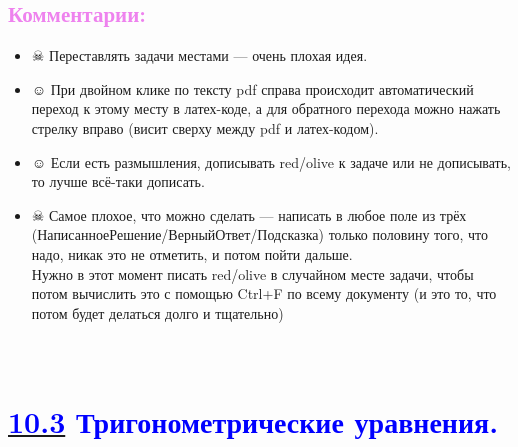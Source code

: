 \documentclass[12pt]{article}
\newcounter{num}
\newenvironment{mylist} %
{ \begin{itemize}
    \setlength{\itemsep}{0pt}
    \setlength{\parskip}{0pt}
    \setlength{\parsep}{0pt}     }
{ \end{itemize}                  }
\begin{document}
\subsection*{\textcolor{Violet}{\textbf{Комментарии:}}}%
\begin{mylist}
\item [$\skull$] Переставлять задачи местами --- очень плохая идея.

\item [$\smiley$] При двойном клике по тексту pdf справа происходит автоматический переход к этому месту в латех-коде, а для обратного перехода можно нажать стрелку вправо (висит сверху между pdf и латех-кодом).

\item [$\smiley$] Если есть размышления, дописывать red/olive к задаче или не дописывать, то лучше всё-таки дописать.

\item [$\skull$] Самое плохое, что можно сделать --- написать в любое поле из трёх (НаписанноеРешение/ВерныйОтвет/Подсказка) только половину того, что надо, никак это не отметить, и потом пойти дальше.\\ Нужно в этот момент писать red/olive в случайном месте задачи, чтобы потом вычислить это с помощью Ctrl+F по всему документу (и это то, что потом будет делаться долго и тщательно)
\end{mylist}

\newpage
\setcounter{num}{1470}

\hypertarget{10.3}{{\centering\section*{\bigskip\\\textcolor{Blue}{\hyperlink{start2}{\textcolor{Blue}{10.3}} Тригонометрические уравнения.}\vspace{-5mm}}}}
\end{document}
